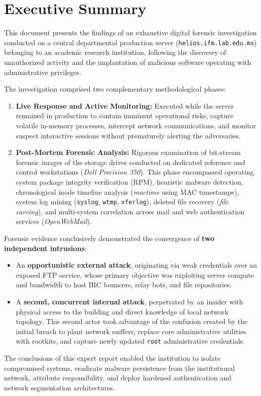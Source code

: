 \chapter*{Executive Summary}

This document presents the findings of an exhaustive digital forensic investigation conducted on a central departmental production server (\nolinkurl{helios.ifm.lab.edu.mx}) belonging to an academic research institution, following the discovery of unauthorized activity and the implantation of malicious software operating with administrative privileges.

The investigation comprised two complementary methodological phases:
\begin{enumerate}
    \item \textbf{Live Response and Active Monitoring:} Executed while the server remained in production to contain imminent operational risks, capture volatile in-memory processes, intercept network communications, and monitor suspect interactive sessions without prematurely alerting the adversaries.
    \item \textbf{Post-Mortem Forensic Analysis:} Rigorous examination of bit-stream forensic images of the storage drives conducted on dedicated reference and control workstations (\textit{Dell Precision 350}). This phase encompassed operating system package integrity verification (RPM), heuristic malware detection, chronological inode timeline analysis (\textit{mactime} using MAC timestamps), system log mining (\texttt{syslog}, \texttt{wtmp}, \texttt{xferlog}), deleted file recovery (\textit{file carving}), and multi-system correlation across mail and web authentication services (\textit{OpenWebMail}).
\end{enumerate}

\begin{notaforense}
Forensic evidence conclusively demonstrated the convergence of \textbf{two independent intrusions}:
\begin{itemize}
    \item An \textbf{opportunistic external attack}, originating via weak credentials over an exposed FTP service, whose primary objective was exploiting server compute and bandwidth to host IRC bouncers, relay bots, and file repositories.
    \item A \textbf{second, concurrent internal attack}, perpetrated by an insider with physical access to the building and direct knowledge of local network topology. This second actor took advantage of the confusion created by the initial breach to plant network sniffers, replace core administrative utilities with rootkits, and capture newly updated \texttt{root} administrative credentials.
\end{itemize}
\end{notaforense}

The conclusions of this expert report enabled the institution to isolate compromised systems, eradicate malware persistence from the institutional network, attribute responsibility, and deploy hardened authentication and network segmentation architectures.
